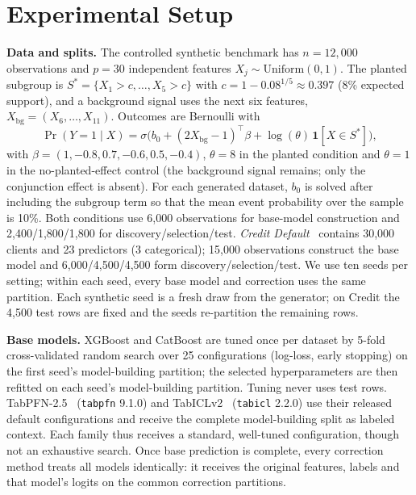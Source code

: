 \documentclass[conference]{IEEEtran}
\begin{document}
\section{Experimental Setup}\label{sec:setup}
\textbf{Data and splits.} The controlled synthetic benchmark has $n=12{,}000$ observations and
$p=30$ independent features $X_j\sim\mathrm{Uniform}(0,1)$. The planted subgroup is
$S^*=\{X_1>c,\ldots,X_5>c\}$ with $c=1-0.08^{1/5}\approx0.397$ (8\% expected support), and a background
signal uses the next six features, $X_{\mathrm{bg}}=(X_6,\ldots,X_{11})$. Outcomes are Bernoulli with
\begin{equation*}
\Pr(Y{=}1\mid X)=\sigma\big(b_0+(2X_{\mathrm{bg}}-1)^\top\beta+\log(\theta)\,\mathbf{1}[X\in S^*]\big),
\end{equation*}
with $\beta=(1,-0.8,0.7,-0.6,0.5,-0.4)$, $\theta=8$ in the planted condition and $\theta=1$ in the
no-planted-effect control (the background signal remains; only the conjunction effect is absent). For each
generated dataset, $b_0$ is solved after including the subgroup term so that the mean event probability
over the sample is 10\%. Both conditions use
6{,}000 observations for base-model construction and 2{,}400/1{,}800/1{,}800 for
 discovery/selection/test. \emph{Credit Default}~\cite{yeh2009credit} contains 30{,}000 clients and
23 predictors (3 categorical); 15{,}000 observations construct the base model and
6{,}000/4{,}500/4{,}500 form discovery/selection/test. We use ten seeds per setting; within each
seed, every base model and correction uses the same partition. Each synthetic seed is a fresh draw
from the generator; on Credit the 4{,}500 test rows are fixed and the seeds re-partition the
remaining rows.

\textbf{Base models.} XGBoost and CatBoost are tuned once per dataset by
5-fold cross-validated random search over 25 configurations (log-loss, early stopping) on the first
seed's model-building partition; the selected hyperparameters are then refitted on each seed's
model-building partition. Tuning never uses test rows. TabPFN-2.5~\cite{grinsztajn2025tabpfn25}
(\texttt{tabpfn} 9.1.0) and TabICLv2~\cite{qu2026tabiclv2} (\texttt{tabicl} 2.2.0) use their
released default configurations and receive the complete model-building split as labeled context.
Each family thus receives a standard, well-tuned configuration, though not an exhaustive search.
Once base prediction is complete, every correction method treats all models identically: it receives
the original features, labels and that model's logits on the common correction partitions.
\end{document}
